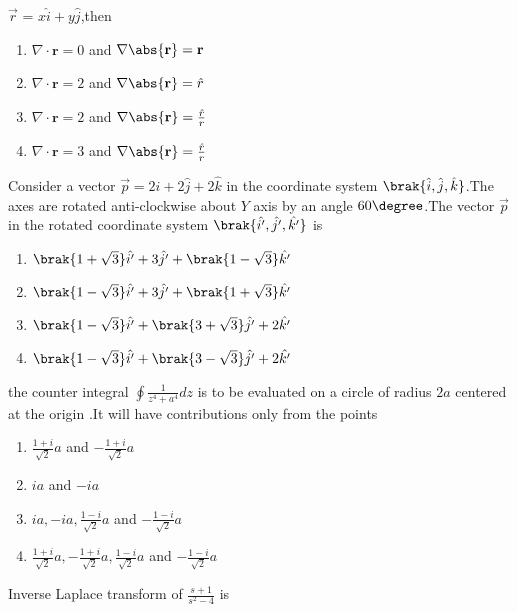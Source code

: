     \item $\Vec{r}$ = $x\hat{i}+y\hat{j}$,then
    \begin{enumerate}
        \item $\nabla\cdot\mathbf{r}=0$ and $\nabla \abs{\mathbf{r}}=\mathbf{r}$
        \item $\nabla\cdot\mathbf{r}=2$ and $\nabla \abs{\mathbf{r}}=\hat{r}$
        \item $\nabla\cdot\mathbf{r}=2$ and $\nabla \abs{\mathbf{r}}=\frac{\hat{r}}{r}$
        \item $\nabla\cdot\mathbf{r}=3$ and $\nabla \abs{\mathbf{r}}=\frac{\hat{r}}{r}$
    \end{enumerate}
    \item Consider a vector $\Vec{p}=
    2\hat{i}+2\hat{j}+2\hat{k}$ in the coordinate system $\brak{\hat{i},\hat{j},\hat{k}}$.The axes are rotated anti-clockwise about $Y$ axis by an angle $60\degree$.The vector $\Vec{p}$ in the rotated coordinate system $\brak{\hat{i^\prime},\hat{j^\prime},\hat{k^\prime}}$ is
    \begin{enumerate}
        \item $\brak{1+\sqrt{3}}\hat{i^\prime}+3\hat{j^\prime}+\brak{1-\sqrt{3}}\hat{k^\prime}$
        \item $\brak{1-\sqrt{3}}\hat{i^\prime}+3\hat{j^\prime}+\brak{1+\sqrt{3}}\hat{k^\prime}$
        \item $\brak{1-\sqrt{3}}\hat{i^\prime}+\brak{3+\sqrt{3}}\hat{j^\prime}+2\hat{k^\prime}$
        \item $\brak{1-\sqrt{3}}\hat{i^\prime}+\brak{3-\sqrt{3}}\hat{j^\prime}+2\hat{k^\prime}$
    \end{enumerate}
    \item the counter integral $\oint \frac{1}{z^4+a^4}dz$ is to be evaluated on a circle of radius $2a$ centered at the origin .It will have contributions only from the points
    \begin{enumerate}
        \item $\frac{1+i}{\sqrt{2}}a$ and $-\frac{1+i}{\sqrt{2}}a$
        \item $ia$ and $-ia$
        \item $ia,-ia,\frac{1-i}{\sqrt{2}}a$ and $-\frac{1-i}{\sqrt{2}}a$
        \item $\frac{1+i}{\sqrt{2}}a,-\frac{1+i}{\sqrt{2}}a,\frac{1-i}{\sqrt{2}}a$ and $-\frac{1-i}{\sqrt{2}}a$
    \end{enumerate}
    \item Inverse Laplace transform of $\frac{s+1}{s^2-4}$ is
